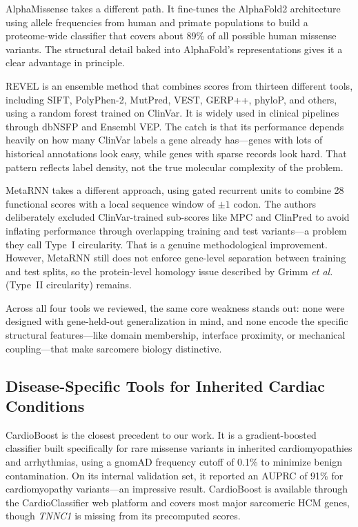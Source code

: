 \documentclass[conference]{IEEEtran}
\begin{document}
AlphaMissense \cite{cheng2023alphamissense} takes a different path. It fine-tunes the AlphaFold2 architecture using allele frequencies from human and primate populations to build a proteome-wide classifier that covers about 89\% of all possible human missense variants. The structural detail baked into AlphaFold's representations gives it a clear advantage in principle.

REVEL \cite{ioannidis2016revel} is an ensemble method that combines scores from thirteen different tools, including SIFT, PolyPhen-2, MutPred, VEST, GERP++, phyloP, and others, using a random forest trained on ClinVar. It is widely used in clinical pipelines through dbNSFP and Ensembl VEP. The catch is that its performance depends heavily on how many ClinVar labels a gene already has---genes with lots of historical annotations look easy, while genes with sparse records look hard. That pattern reflects label density, not the true molecular complexity of the problem.

MetaRNN \cite{li2022metarnn} takes a different approach, using gated recurrent units to combine 28 functional scores with a local sequence window of $\pm 1$ codon. The authors deliberately excluded ClinVar-trained sub-scores like MPC and ClinPred to avoid inflating performance through overlapping training and test variants---a problem they call Type~I circularity. That is a genuine methodological improvement. However, MetaRNN still does not enforce gene-level separation between training and test splits, so the protein-level homology issue described by Grimm \textit{et al.} \cite{grimm2015circularity} (Type~II circularity) remains.

Across all four tools we reviewed, the same core weakness stands out: none were designed with gene-held-out generalization in mind, and none encode the specific structural features---like domain membership, interface proximity, or mechanical coupling---that make sarcomere biology distinctive.

\subsection{Disease-Specific Tools for Inherited Cardiac Conditions}

CardioBoost \cite{zhang2021cardioboost} is the closest precedent to our work. It is a gradient-boosted classifier built specifically for rare missense variants in inherited cardiomyopathies and arrhythmias, using a gnomAD frequency cutoff of 0.1\% to minimize benign contamination. On its internal validation set, it reported an AUPRC of 91\% for cardiomyopathy variants---an impressive result. CardioBoost is available through the CardioClassifier web platform and covers most major sarcomeric HCM genes, though \textit{TNNC1} is missing from its precomputed scores.
\end{document}

